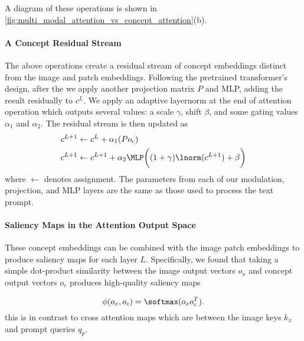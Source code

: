 
A diagram of these operations is shown in \cref{fig:multi_modal_attention_vs_concept_attention}(b).


\paragraph{A Concept Residual Stream}

The above operations create a residual stream of concept embeddings distinct from the image and patch embeddings. Following the pretrained transformer's design, after the \layername{} we apply another projection matrix $P$ and MLP, adding the result residually to $c^{L}$.
We apply an adaptive layernorm at the end of attention operation which outputs several values: a scale $\gamma$, shift $\beta$, and some gating values $\alpha_1$ and $\alpha_2$. The residual stream is then updated as
\begin{align}
    c^{L + 1} & \gets c^L + \alpha_1 (P o_{c}) \\
    c^{L + 1} & \gets c^{L+1} + \alpha_2 \MLP\bigg(( 1 + \gamma) \lnorm(c^{L + 1}) + \beta\bigg)
\end{align}
where $\gets$ denotes assignment. The parameters from each of our modulation, projection, and MLP layers are the same as those used to process the text prompt. 

\paragraph{Saliency Maps in the Attention Output Space}
These concept embeddings can be combined with the image patch embeddings to produce saliency maps for each layer $L$. Specifically, we found that taking a simple dot-product similarity between the image output vectors $o_x$ and concept output vectors $o_c$ produces high-quality saliency maps

\begin{equation}
\label{eq:dot-prod-saliency}
    \phi(o_x, o_c) = \softmax(o_x o_c^T ).
\end{equation}
this is in contrast to cross attention maps which are between the image keys $k_x$ and prompt queries $q_p$.


